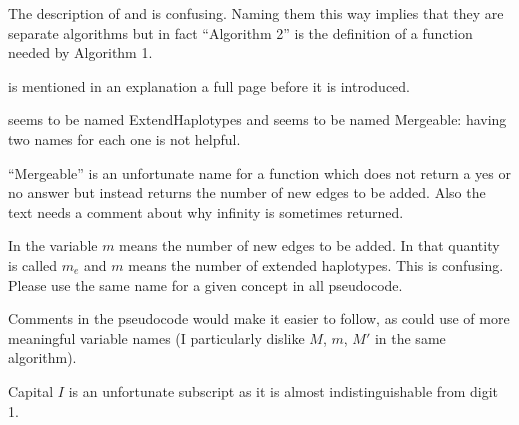 \begin{point}{} %
The description of  and  is confusing.
Naming them this way implies that they are separate algorithms but
in fact ``Algorithm 2'' is the definition of a function needed by
Algorithm 1.
\end{point}

\reply{
}

\begin{point}{}
 is mentioned in an explanation a full page before it
is introduced.
\end{point}

\reply{
}

\begin{point}{}
 seems to be named ExtendHaplotypes and  seems
to be named Mergeable: having two names for each one is not helpful.
\end{point}

\reply{
}

\begin{point}{}
``Mergeable'' is an unfortunate name for a function which does not
return a yes or no answer but instead returns the number of
new edges to be added. Also the text needs a comment about why
infinity is sometimes returned.
\end{point}

\reply{
}

\begin{point}{}
In  the variable $m$ means the number of new edges to be
added. In  that quantity is called $m_e$ and $m$ means the
number of extended haplotypes. This is confusing. Please use the
same name for a given concept in all pseudocode.
\end{point}

\reply{
}

\begin{point}{}
Comments in the pseudocode would make it easier to follow, as could
use of more meaningful variable names (I particularly dislike $M$, $m$, $M'$
in the same algorithm).
\end{point}

\reply{
}

\begin{point}{}
Capital $I$ is an unfortunate subscript as it is almost indistinguishable
from digit 1.
\end{point}

